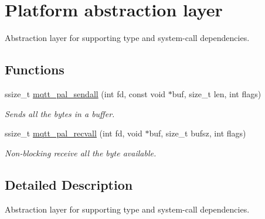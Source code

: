 \hypertarget{group__pal}{}\section{Platform abstraction layer}
\label{group__pal}


Abstraction layer for supporting type and system-\/call dependencies.  


\subsection*{Functions}
\begin{DoxyCompactItemize}
\item 
ssize\+\_\+t \hyperlink{group__pal_gac8dd7d5af889f5933dda733007adb9a3}{mqtt\+\_\+pal\+\_\+sendall} (int fd, const void $\ast$buf, size\+\_\+t len, int flags)
\begin{DoxyCompactList}\small\item\em Sends all the bytes in a buffer. \end{DoxyCompactList}\item 
ssize\+\_\+t \hyperlink{group__pal_ga620d6ab20694c9b4d99293a47491004e}{mqtt\+\_\+pal\+\_\+recvall} (int fd, void $\ast$buf, size\+\_\+t bufsz, int flags)
\begin{DoxyCompactList}\small\item\em Non-\/blocking receive all the byte available. \end{DoxyCompactList}\end{DoxyCompactItemize}


\subsection{Detailed Description}
Abstraction layer for supporting type and system-\/call dependencies. 

